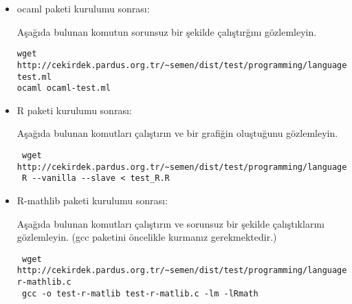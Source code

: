 \documentclass[a4paper,10pt]{article}
\begin{document}
\begin{itemize}
\item ocaml paketi kurulumu sonrası:

Aşağıda bulunan komutun sorunsuz bir şekilde çalıştırğını gözlemleyin.
\begin{verbatim}
wget http://cekirdek.pardus.org.tr/~semen/dist/test/programming/language/ocaml-test.ml 
ocaml ocaml-test.ml
\end{verbatim}

 \item R paketi kurulumu sonrası:

Aşağıda bulunan komutları çalıştırın ve bir grafiğin oluştuğunu gözlemleyin.
\begin{verbatim}
 wget http://cekirdek.pardus.org.tr/~semen/dist/test/programming/language/test_R.R
 R --vanilla --slave < test_R.R
\end{verbatim}
\item R-mathlib paketi kurulumu sonrası:

Aşağıda bulunan komutları çalıştırın ve sorunsuz bir şekilde çalıştıklarını gözlemleyin. (gcc paketini öncelikle kurmanız gerekmektedir.)	
\begin{verbatim}
 wget http://cekirdek.pardus.org.tr/~semen/dist/test/programming/language/test-r-mathlib.c
 gcc -o test-r-matlib test-r-matlib.c -lm -lRmath
\end{verbatim}
\end{itemize}
\end{document}
